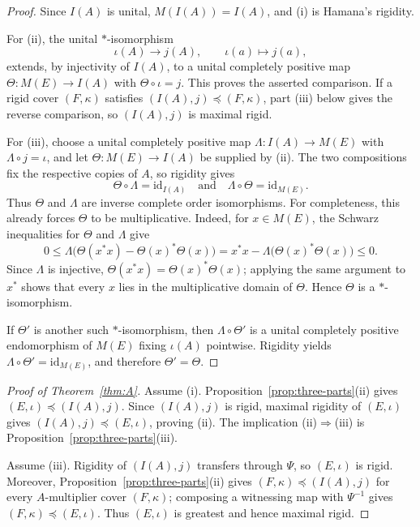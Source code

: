 \documentclass[11pt,a4paper]{amsart}
\numberwithin{equation}{section}
\theoremstyle{paperplain}
\theoremstyle{remark}
\newcommand{\Id}{\mathrm{id}}
\begin{document}
\begin{proof}
Since $I(A)$ is unital, $M(I(A))=I(A)$, and (i) is Hamana's rigidity.

For (ii), the unital $*$-isomorphism
\[
\iota(A)\longrightarrow j(A),\qquad \iota(a)\longmapsto j(a),
\]
extends, by injectivity of $I(A)$, to a unital completely positive map $\Theta\colon M(E)\to I(A)$ with $\Theta\circ\iota=j$. This proves the asserted comparison. If a rigid cover $(F,\kappa)$ satisfies $(I(A),j)\preccurlyeq(F,\kappa)$, part (iii) below gives the reverse comparison, so $(I(A),j)$ is maximal rigid.

For (iii), choose a unital completely positive map $\Lambda\colon I(A)\to M(E)$ with $\Lambda\circ j=\iota$, and let $\Theta\colon M(E)\to I(A)$ be supplied by (ii). The two compositions fix the respective copies of $A$, so rigidity gives
\[
\Theta\circ\Lambda=\Id_{I(A)}
\quad\text{and}\quad
\Lambda\circ\Theta=\Id_{M(E)}.
\]
Thus $\Theta$ and $\Lambda$ are inverse complete order isomorphisms. For completeness, this already forces $\Theta$ to be multiplicative. Indeed, for $x\in M(E)$, the Schwarz inequalities for $\Theta$ and $\Lambda$ give
\[
0\leqslant \Lambda\bigl(\Theta(x^*x)-\Theta(x)^*\Theta(x)\bigr)
=x^*x-\Lambda\bigl(\Theta(x)^*\Theta(x)\bigr)\leqslant 0.
\]
Since $\Lambda$ is injective, $\Theta(x^*x)=\Theta(x)^*\Theta(x)$; applying the same argument to $x^*$ shows that every $x$ lies in the multiplicative domain of $\Theta$. Hence $\Theta$ is a $*$-isomorphism.

If $\Theta'$ is another such $*$-isomorphism, then $\Lambda\circ\Theta'$ is a unital completely positive endomorphism of $M(E)$ fixing $\iota(A)$ pointwise. Rigidity yields $\Lambda\circ\Theta'=\Id_{M(E)}$, and therefore $\Theta'=\Theta$.
\end{proof}

\begin{proof}[Proof of Theorem~\ref{thm:A}]
Assume (i). Proposition~\ref{prop:three-parts}(ii) gives $(E,\iota)\preccurlyeq(I(A),j)$. Since $(I(A),j)$ is rigid, maximal rigidity of $(E,\iota)$ gives $(I(A),j)\preccurlyeq(E,\iota)$, proving (ii). The implication (ii)$\Rightarrow$(iii) is Proposition~\ref{prop:three-parts}(iii).

Assume (iii). Rigidity of $(I(A),j)$ transfers through $\Psi$, so $(E,\iota)$ is rigid. Moreover, Proposition~\ref{prop:three-parts}(ii) gives $(F,\kappa)\preccurlyeq(I(A),j)$ for every $A$-multiplier cover $(F,\kappa)$; composing a witnessing map with $\Psi^{-1}$ gives $(F,\kappa)\preccurlyeq(E,\iota)$. Thus $(E,\iota)$ is greatest and hence maximal rigid.
\end{proof}
\end{document}
